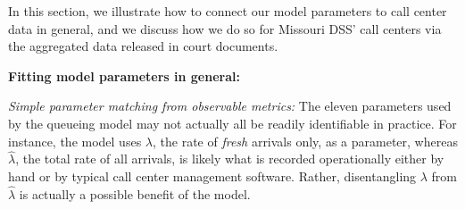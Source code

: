 \documentclass[manuscript,screen,authorversion]{acmart}
\begin{document}
In this section, we illustrate how to connect our model parameters to call center data in general, and we discuss how we do so for Missouri DSS' call centers via the aggregated data released in court documents. %



\textbf{Fitting model parameters in general: }

\textit{Simple parameter matching from observable metrics: }The eleven parameters used by the queueing model
may not actually all be readily identifiable in practice. For instance, the model uses $\lambda$, the rate of \emph{fresh} arrivals only, as a parameter, whereas $\hat \lambda$, the total rate of all arrivals, is likely what is recorded operationally either by hand or by typical call center management software. Rather, disentangling $\lambda$ from $\hat \lambda$ is actually a possible benefit of the model. 
\end{document}
